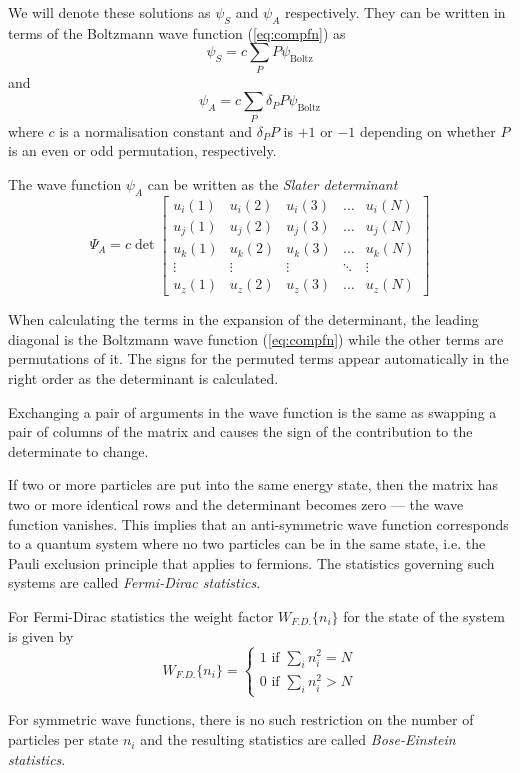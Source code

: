 We will denote these solutions as $\psi_S$ and $\psi_A$ respectively. They can be written in terms of the Boltzmann wave function (\ref{eq:compfn}) as
$$
	\psi_S=c\sum_P P\psi_\text{Boltz}
$$
and
$$
	\psi_A=c\sum_P \delta_PP\psi_\text{Boltz}
$$
where $c$ is a normalisation constant and $\delta_PP$ is $+1$ or $-1$ depending on whether $P$ is an even or odd permutation, respectively.

The wave function $\psi_A$ can be written as the \emph{Slater determinant} 
$$
	\Psi_A = c\det\begin{bmatrix}
		u_i(1) & u_i(2) & u_i(3) & \dots & u_i(N)\\
		u_j(1) & u_j(2) & u_j(3) & \dots & u_j(N)\\
		u_k(1) & u_k(2) & u_k(3) & \dots & u_k(N)\\
		\vdots & \vdots & \vdots & \ddots & \vdots \\
		u_z(1) & u_z(2) & u_z(3) & \dots & u_z(N)
	\end{bmatrix}
$$

When calculating the terms in the expansion of the determinant, the leading diagonal is the Boltzmann wave function (\ref{eq:compfn}) while the other terms are permutations of it. The signs for the permuted terms appear automatically in the right order as the determinant is calculated.

Exchanging a pair of arguments in the wave function is the same as swapping a pair of columns of the matrix and causes the sign of the contribution to the determinate to change.

If two or more particles are put into the same energy state, then the matrix has two or more identical rows and the determinant becomes zero --- the wave function vanishes. This implies that an anti-symmetric wave function corresponds to a quantum system where no two particles can be in the same state, i.e. the Pauli exclusion principle that applies to fermions. The statistics governing such systems are called \emph{Fermi-Dirac statistics}.

For Fermi-Dirac statistics the weight factor $W_{F.D.}\{n_i\}$ for the state of the system is given by
$$
	W_{F.D.}\{n_i\} = 
	\begin{cases}
		1 \text{ if } \sum_i n_i^2 = N\\
		0 \text{ if } \sum_i n_i^2 > N
	\end{cases}
$$


For symmetric wave functions, there is no such restriction on the number of particles per state $n_i$ and the resulting statistics are called \emph{Bose-Einstein statistics}.

